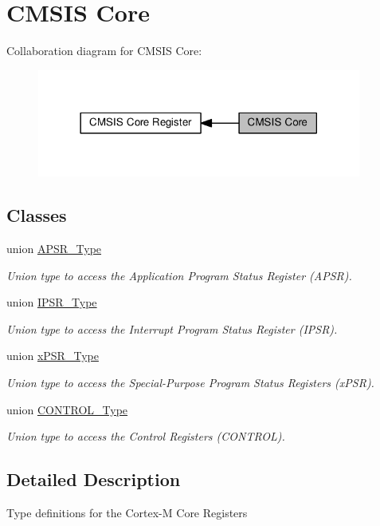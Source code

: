 \hypertarget{group___c_m_s_i_s___c_o_r_e}{}\section{C\+M\+S\+IS Core}
\label{group___c_m_s_i_s___c_o_r_e}
Collaboration diagram for C\+M\+S\+IS Core\+:\nopagebreak
\begin{figure}[H]
\begin{center}
\leavevmode
\includegraphics[width=302pt]{group___c_m_s_i_s___c_o_r_e}
\end{center}
\end{figure}
\subsection*{Classes}
\begin{DoxyCompactItemize}
\item 
union \hyperlink{union_a_p_s_r___type}{A\+P\+S\+R\+\_\+\+Type}
\begin{DoxyCompactList}\small\item\em Union type to access the Application Program Status Register (A\+P\+SR). \end{DoxyCompactList}\item 
union \hyperlink{union_i_p_s_r___type}{I\+P\+S\+R\+\_\+\+Type}
\begin{DoxyCompactList}\small\item\em Union type to access the Interrupt Program Status Register (I\+P\+SR). \end{DoxyCompactList}\item 
union \hyperlink{unionx_p_s_r___type}{x\+P\+S\+R\+\_\+\+Type}
\begin{DoxyCompactList}\small\item\em Union type to access the Special-\/\+Purpose Program Status Registers (x\+P\+SR). \end{DoxyCompactList}\item 
union \hyperlink{union_c_o_n_t_r_o_l___type}{C\+O\+N\+T\+R\+O\+L\+\_\+\+Type}
\begin{DoxyCompactList}\small\item\em Union type to access the Control Registers (C\+O\+N\+T\+R\+OL). \end{DoxyCompactList}\end{DoxyCompactItemize}


\subsection{Detailed Description}
Type definitions for the Cortex-\/M Core Registers 